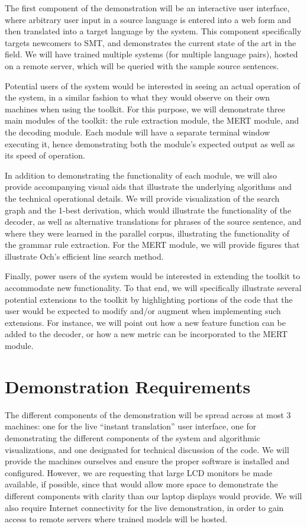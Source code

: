 \documentclass[11pt]{article}
\begin{document}
The first component of the demonstration will be an interactive user interface,
where arbitrary user input in a source language is entered into a web form and
then translated into a target language by the system.  This component
specifically targets newcomers to SMT, and demonstrates the current state of
the art in the field.  We will have trained multiple systems (for multiple
language pairs), hosted on a remote server, which will be queried with the
sample source sentences.

Potential users of the system would be interested in seeing an actual operation
of the system, in a similar fashion to what they would observe on their own
machines when using the toolkit.  For this purpose, we will demonstrate three
main modules of the toolkit: the rule extraction module, the MERT module, and
the decoding module.  Each module will have a separate terminal window
executing it, hence demonstrating both the module's expected output as well as
its speed of operation.

In addition to demonstrating the functionality of each module, we will also
provide accompanying visual aids that illustrate the underlying algorithms and
the technical operational details.  We will provide visualization of the search
graph and the 1-best derivation, which would illustrate the functionality of
the decoder, as well as alternative translations for phrases of the source
sentence, and where they were learned in the parallel corpus, illustrating the
functionality of the grammar rule extraction.  For the MERT module, we will
provide figures that illustrate Och's efficient line search method.

Finally, power users of the system would be interested in extending the toolkit
to accommodate new functionality.  To that end, we will specifically illustrate
several potential extensions to the toolkit by highlighting portions of the
code that the user would be expected to modify and/or augment when implementing
such extensions.  For instance, we will point out how a new feature function
can be added to the decoder, or how a new metric can be incorporated to the
MERT module.

\section{Demonstration Requirements}

The different components of the demonstration will be spread across at most 3
machines: one for the live ``instant translation'' user interface, one for
demonstrating the different components of the system and algorithmic
visualizations, and one designated for technical discussion of the code.  We
will provide the machines ourselves and ensure the proper software is installed
and configured.  However, we are requesting that large LCD monitors be made
available, if possible, since that would allow more space to demonstrate the
different components with clarity than our laptop displays would provide.  We
will also require Internet connectivity for the live demonstration, in order to
gain access to remote servers where trained models will be hosted.
\end{document}
